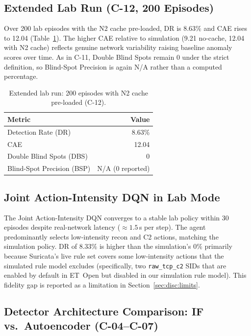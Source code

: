 \documentclass[sigconf]{acmart}
\begin{document}
\subsection{Extended Lab Run (C-12, 200 Episodes)}
\label{sec:lab200}

Over 200 lab episodes with the N2 cache pre-loaded, DR is 8.63\% and
CAE rises to 12.04 (Table~\ref{tab:lab200}). The higher CAE relative
to simulation (9.21 no-cache, 12.04 with N2 cache) reflects genuine
network variability raising baseline anomaly scores over time.
As in C-11, Double Blind Spots remain 0 under the strict definition,
so Blind-Spot Precision is again N/A rather than a computed
percentage.

\begin{table}[t]
\caption{Extended lab run: 200 episodes with N2 cache pre-loaded (C-12).}
\label{tab:lab200}
\centering
\small
\begin{tabular}{l r}
\toprule
Metric & Value \\
\midrule
Detection Rate (DR)        & 8.63\% \\
CAE                        & 12.04 \\
Double Blind Spots (DBS)   & 0 \\
Blind-Spot Precision (BSP) & N/A (0 reported) \\
\bottomrule
\end{tabular}
\end{table}

\subsection{Joint Action-Intensity DQN in Lab Mode}
\label{sec:dqn_lab}

The Joint Action-Intensity DQN converges to a stable lab policy within 30 episodes
despite real-network latency ($\approx 1.5$\,s per step). The agent
predominantly selects low-intensity recon and C2 actions, matching the
simulation policy. DR of 8.33\% is higher than the simulation's 0\%
primarily because Suricata's live rule set covers some low-intensity
actions that the simulated rule model excludes (specifically, two
\texttt{raw\_tcp\_c2} SIDs that are enabled by default in ET~Open but
disabled in our simulation rule model). This fidelity gap is reported
as a limitation in Section~\ref{sec:disc:limits}.

\subsection{Detector Architecture Comparison: IF vs.\ Autoencoder (C-04--C-07)}
\label{sec:detector}
\end{document}
